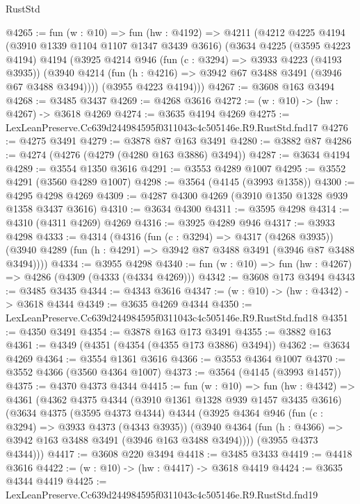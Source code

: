 \begin{lexlean}{RustStd}
\begin{coremodule}
@4265 := fun (w : @10) =>
  fun (hw : @4192) =>
  @4211
    (@4212
      @4225
      @4194
      (@3910 @1339 @1104 @1107 @1347 @3439 @3616)
      (@3634
        @4225
        (@3595 @4223 @4194)
        @4194
        (@3925
          @4214
          @946
          (fun (c : @3294) => @3933 @4223 (@4193 @3935))
          (@3940 @4214 (fun (h : @4216) => @3942 @67 @3488 @3491 (@3946 @67 @3488 @3494))))
        (@3955 @4223 @4194)))
@4267 := @3608 @163 @3494
@4268 := @3485 @3437
@4269 := @4268 @3616
@4272 := (w : @10) -> (hw : @4267) -> @3618 @4269
@4274 := @3635 @4194 @4269
@4275 := LexLeanPreserve.Cc639d244984595f0311043c4c505146e.R9.RustStd.fnd17
@4276 := @4275 @3491
@4279 := @3878 @87 @163 @3491
@4280 := @3882 @87
@4286 := @4274 (@4276 (@4279 (@4280 @163 @3886) @3494))
@4287 := @3634 @4194
@4289 := @3554 @1350 @3616
@4291 := @3553 @4289 @1007
@4295 := @3552 @4291 (@3560 @4289 @1007)
@4298 := @3564 (@4145 (@3993 @1358))
@4300 := @4295 @4298 @4269
@4309 := @4287 @4300 @4269 (@3910 @1350 @1328 @939 @1358 @3437 @3616)
@4310 := @3634 @4300
@4311 := @3595 @4298
@4314 := @4310 (@4311 @4269) @4269
@4316 := @3925 @4289 @946
@4317 := @3933 @4298
@4333 := @4314
    (@4316
      (fun (c : @3294) => @4317 (@4268 @3935))
      (@3940 @4289 (fun (h : @4291) => @3942 @87 @3488 @3491 (@3946 @87 @3488 @3494))))
@4334 := @3955 @4298
@4340 := fun (w : @10) => fun (hw : @4267) => @4286 (@4309 (@4333 (@4334 @4269)))
@4342 := @3608 @173 @3494
@4343 := @3485 @3435
@4344 := @4343 @3616
@4347 := (w : @10) -> (hw : @4342) -> @3618 @4344
@4349 := @3635 @4269 @4344
@4350 := LexLeanPreserve.Cc639d244984595f0311043c4c505146e.R9.RustStd.fnd18
@4351 := @4350 @3491
@4354 := @3878 @163 @173 @3491
@4355 := @3882 @163
@4361 := @4349 (@4351 (@4354 (@4355 @173 @3886) @3494))
@4362 := @3634 @4269
@4364 := @3554 @1361 @3616
@4366 := @3553 @4364 @1007
@4370 := @3552 @4366 (@3560 @4364 @1007)
@4373 := @3564 (@4145 (@3993 @1457))
@4375 := @4370 @4373 @4344
@4415 := fun (w : @10) =>
  fun (hw : @4342) =>
  @4361
    (@4362
      @4375
      @4344
      (@3910 @1361 @1328 @939 @1457 @3435 @3616)
      (@3634
        @4375
        (@3595 @4373 @4344)
        @4344
        (@3925
          @4364
          @946
          (fun (c : @3294) => @3933 @4373 (@4343 @3935))
          (@3940 @4364 (fun (h : @4366) => @3942 @163 @3488 @3491 (@3946 @163 @3488 @3494))))
        (@3955 @4373 @4344)))
@4417 := @3608 @220 @3494
@4418 := @3485 @3433
@4419 := @4418 @3616
@4422 := (w : @10) -> (hw : @4417) -> @3618 @4419
@4424 := @3635 @4344 @4419
@4425 := LexLeanPreserve.Cc639d244984595f0311043c4c505146e.R9.RustStd.fnd19

\end{coremodule}
\end{lexlean}
